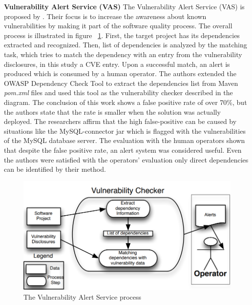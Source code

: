 \documentclass[pdf,bookmarks,colorlinks=true]{IEEEtran}
\begin{document}

\textbf{Vulnerability Alert Service (VAS)}
The Vulnerability Alert Service (VAS) is proposed by \cite{Cadariu2015}. Their focus is to increase the awareness about known vulnerabilities by making it part of the software quality process. The overall process is illustrated in figure ~\ref{VASProcess}. First, the target project has its dependencies extracted and recognized. Then, list of dependencies is analyzed by the matching task, which tries to match the dependency with an entry from the vulnerability disclosures, in this study a CVE entry. Upon a successful match, an alert is produced which is consumed by a human operator. The authors extended the OWASP Dependency Check Tool to extract the dependencies list from Maven {\em pom.xml} files and used this tool as the vulnerability checker described in the diagram.
The conclusion of this work shows a false positive rate of over 70\%, but the authors state that the rate is smaller when the solution was actually deployed. 
The researchers affirm that the high false-positive can be caused by situations like the MySQL-connector jar which is flagged with the vulnerabilities of the MySQL database server. The evaluation with the human operators shown that despite the false positive rate, an alert system was considered useful. Even the authors were satisfied with the operators' evaluation only direct dependencies can be identified by their method.

\begin{figure}[h]
	\centering
	\includegraphics[scale=0.28]{VASProcess.png}
	\caption{The Vulnerability Alert Service process}
	\label{VASProcess}
\end{figure}
\end{document}
